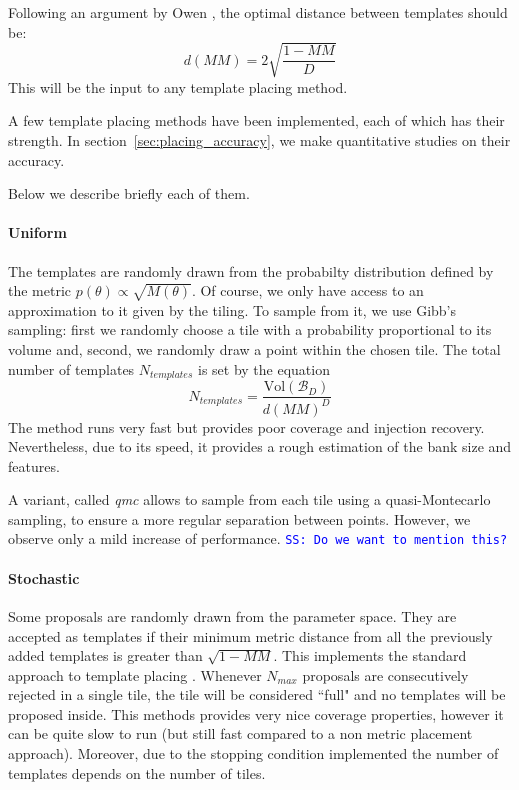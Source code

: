 \documentclass[twocolumn,showpacs,preprintnumbers,nofootinbib,prd,
superscriptaddress,10pt]{revtex4-2}
\newcommand{\stefano}[1]{{\textcolor{blue}{\texttt{SS: #1}} }}
\begin{document}
Following an argument by Owen \cite{owen_metric}, the optimal distance between templates should be:
\begin{equation}
	d(MM) = 2 \sqrt{\frac{1-MM}{D}}
\end{equation}
This will be the input to any template placing method.

A few template placing methods have been implemented, each of which has their strength. In section~\ref{sec:placing_accuracy}, we make quantitative studies on their accuracy.

Below we describe briefly each of them.

\paragraph{Uniform}\label{par:uniform}
The templates are randomly drawn from the probabilty distribution defined by the metric $p(\theta) \propto \sqrt{M(\theta)}$.
Of course, we only have access to an approximation to it given by the tiling. To sample from it, we use Gibb's sampling: first we randomly choose a tile with a probability proportional to its volume and, second, we randomly draw a point within the chosen tile.
The total number of templates $N_{templates}$ is set by the equation
\begin{equation} \label{eq:N_templates}
	N_{templates} = \frac{\text{Vol}(\mathcal{B}_D)}{d(MM)^D}
\end{equation}
The method runs very fast but provides poor coverage and injection recovery. Nevertheless, due to its speed, it provides a rough estimation of the bank size and features.

A variant, called {\it qmc} allows to sample from each tile using a quasi-Montecarlo sampling, to ensure a more regular separation between points. However, we observe only a mild increase of performance.
\stefano{Do we want to mention this?}
\paragraph{Stochastic}\label{par:stochastic}
Some proposals are randomly drawn from the parameter space. They are accepted as templates if their minimum metric distance from all the previously added templates is greater than  $\sqrt{1-MM}$.
This implements the standard approach to template placing \cite{}.
Whenever $N_{max}$ proposals are consecutively rejected in a single tile, the tile will be considered ``full" and no templates will be proposed inside.
This methods provides very nice coverage properties, however it can be quite slow to run (but still fast compared to a non metric placement approach). Moreover, due to the stopping condition implemented the number of templates depends on the number of tiles.
\end{document}
